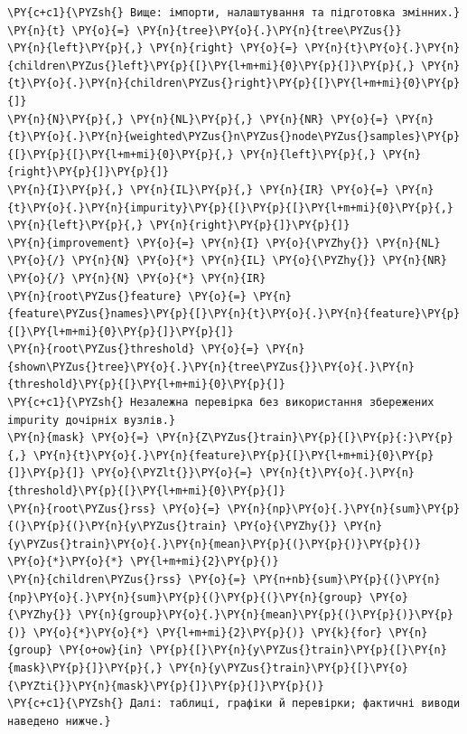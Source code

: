 \begin{Verbatim}[commandchars=\\\{\}]
\PY{c+c1}{\PYZsh{} Вище: імпорти, налаштування та підготовка змінних.}
\PY{n}{t} \PY{o}{=} \PY{n}{tree}\PY{o}{.}\PY{n}{tree\PYZus{}}
\PY{n}{left}\PY{p}{,} \PY{n}{right} \PY{o}{=} \PY{n}{t}\PY{o}{.}\PY{n}{children\PYZus{}left}\PY{p}{[}\PY{l+m+mi}{0}\PY{p}{]}\PY{p}{,} \PY{n}{t}\PY{o}{.}\PY{n}{children\PYZus{}right}\PY{p}{[}\PY{l+m+mi}{0}\PY{p}{]}
\PY{n}{N}\PY{p}{,} \PY{n}{NL}\PY{p}{,} \PY{n}{NR} \PY{o}{=} \PY{n}{t}\PY{o}{.}\PY{n}{weighted\PYZus{}n\PYZus{}node\PYZus{}samples}\PY{p}{[}\PY{p}{[}\PY{l+m+mi}{0}\PY{p}{,} \PY{n}{left}\PY{p}{,} \PY{n}{right}\PY{p}{]}\PY{p}{]}
\PY{n}{I}\PY{p}{,} \PY{n}{IL}\PY{p}{,} \PY{n}{IR} \PY{o}{=} \PY{n}{t}\PY{o}{.}\PY{n}{impurity}\PY{p}{[}\PY{p}{[}\PY{l+m+mi}{0}\PY{p}{,} \PY{n}{left}\PY{p}{,} \PY{n}{right}\PY{p}{]}\PY{p}{]}
\PY{n}{improvement} \PY{o}{=} \PY{n}{I} \PY{o}{\PYZhy{}} \PY{n}{NL} \PY{o}{/} \PY{n}{N} \PY{o}{*} \PY{n}{IL} \PY{o}{\PYZhy{}} \PY{n}{NR} \PY{o}{/} \PY{n}{N} \PY{o}{*} \PY{n}{IR}
\PY{n}{root\PYZus{}feature} \PY{o}{=} \PY{n}{feature\PYZus{}names}\PY{p}{[}\PY{n}{t}\PY{o}{.}\PY{n}{feature}\PY{p}{[}\PY{l+m+mi}{0}\PY{p}{]}\PY{p}{]}
\PY{n}{root\PYZus{}threshold} \PY{o}{=} \PY{n}{shown\PYZus{}tree}\PY{o}{.}\PY{n}{tree\PYZus{}}\PY{o}{.}\PY{n}{threshold}\PY{p}{[}\PY{l+m+mi}{0}\PY{p}{]}
\PY{c+c1}{\PYZsh{} Незалежна перевірка без використання збережених impurity дочірніх вузлів.}
\PY{n}{mask} \PY{o}{=} \PY{n}{Z\PYZus{}train}\PY{p}{[}\PY{p}{:}\PY{p}{,} \PY{n}{t}\PY{o}{.}\PY{n}{feature}\PY{p}{[}\PY{l+m+mi}{0}\PY{p}{]}\PY{p}{]} \PY{o}{\PYZlt{}}\PY{o}{=} \PY{n}{t}\PY{o}{.}\PY{n}{threshold}\PY{p}{[}\PY{l+m+mi}{0}\PY{p}{]}
\PY{n}{root\PYZus{}rss} \PY{o}{=} \PY{n}{np}\PY{o}{.}\PY{n}{sum}\PY{p}{(}\PY{p}{(}\PY{n}{y\PYZus{}train} \PY{o}{\PYZhy{}} \PY{n}{y\PYZus{}train}\PY{o}{.}\PY{n}{mean}\PY{p}{(}\PY{p}{)}\PY{p}{)} \PY{o}{*}\PY{o}{*} \PY{l+m+mi}{2}\PY{p}{)}
\PY{n}{children\PYZus{}rss} \PY{o}{=} \PY{n+nb}{sum}\PY{p}{(}\PY{n}{np}\PY{o}{.}\PY{n}{sum}\PY{p}{(}\PY{p}{(}\PY{n}{group} \PY{o}{\PYZhy{}} \PY{n}{group}\PY{o}{.}\PY{n}{mean}\PY{p}{(}\PY{p}{)}\PY{p}{)} \PY{o}{*}\PY{o}{*} \PY{l+m+mi}{2}\PY{p}{)} \PY{k}{for} \PY{n}{group} \PY{o+ow}{in} \PY{p}{[}\PY{n}{y\PYZus{}train}\PY{p}{[}\PY{n}{mask}\PY{p}{]}\PY{p}{,} \PY{n}{y\PYZus{}train}\PY{p}{[}\PY{o}{\PYZti{}}\PY{n}{mask}\PY{p}{]}\PY{p}{]}\PY{p}{)}
\PY{c+c1}{\PYZsh{} Далі: таблиці, графіки й перевірки; фактичні виводи наведено нижче.}
\end{Verbatim}
